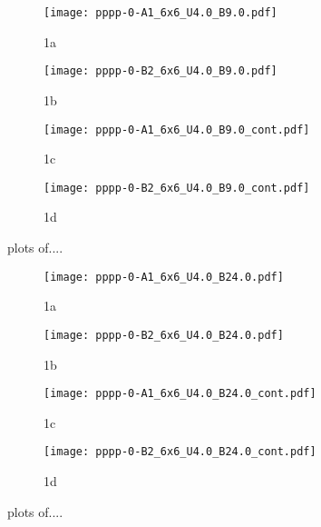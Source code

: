 \begin{figure}
  \begin{subfigure}{.5\textwidth}
    \centering
    \texttt{[image: pppp-0-A1\_6x6\_U4.0\_B9.0.pdf]}
    \caption{1a}
    \label{fig:sfig1}
  \end{subfigure}%
  \begin{subfigure}{.5\textwidth}
    \centering
    \texttt{[image: pppp-0-B2\_6x6\_U4.0\_B9.0.pdf]}
    \caption{1b}
    \label{fig:sfig2}
  \end{subfigure}
  \begin{subfigure}{.5\textwidth}
      \centering
      \texttt{[image: pppp-0-A1\_6x6\_U4.0\_B9.0\_cont.pdf]}
      \caption{1c}
      \label{fig:sfig3}
  \end{subfigure}
  \begin{subfigure}{.5\textwidth}
      \centering
      \texttt{[image: pppp-0-B2\_6x6\_U4.0\_B9.0\_cont.pdf]}
      \caption{1d}
      \label{fig:sfig4}
  \end{subfigure}
  \caption{plots of....}
  \label{fig:fig}
\end{figure}

\begin{figure}
  \begin{subfigure}{.5\textwidth}
    \centering
    \texttt{[image: pppp-0-A1\_6x6\_U4.0\_B24.0.pdf]}
    \caption{1a}
    \label{fig:sfig1}
  \end{subfigure}%
  \begin{subfigure}{.5\textwidth}
    \centering
    \texttt{[image: pppp-0-B2\_6x6\_U4.0\_B24.0.pdf]}
    \caption{1b}
    \label{fig:sfig2}
  \end{subfigure}
  \begin{subfigure}{.5\textwidth}
      \centering
      \texttt{[image: pppp-0-A1\_6x6\_U4.0\_B24.0\_cont.pdf]}
      \caption{1c}
      \label{fig:sfig3}
  \end{subfigure}
  \begin{subfigure}{.5\textwidth}
      \centering
      \texttt{[image: pppp-0-B2\_6x6\_U4.0\_B24.0\_cont.pdf]}
      \caption{1d}
      \label{fig:sfig4}
  \end{subfigure}
  \caption{plots of....}
  \label{fig:fig}
\end{figure}

